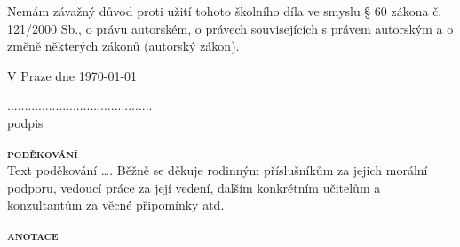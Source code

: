 \documentclass[12pt,a4paper]{article} %
\begin{document}
{Nemám závažný důvod proti užití tohoto školního díla ve smyslu § 60 zákona č. 121/2000 Sb., o právu autorském, o právech souvisejících s právem autorským a o změně některých zákonů (autorský zákon).}\\[0.5cm]

\begin{minipage}{0.49\textwidth}
\begin{flushleft}
{V Praze dne \today}\\%
\bigskip
\bigskip
\end{flushleft}
\end{minipage}
\begin{minipage}{0.49\textwidth}
\begin{flushright}
\centering
{
..........................................\\
podpis
}
\end{flushright}
\end{minipage}

\newpage
\textsc{\textbf{\fontsize{20pt}{0}\selectfont poděkování}}\\

{\color{red} Text poděkování …. Běžně se děkuje rodinným příslušníkům za jejich morální podporu, vedoucí práce za její vedení, dalším konkrétním učitelům a konzultantům za věcné připomínky atd.}

\newpage

\textsc{\textbf{\fontsize{20pt}{0}\selectfont anotace}}\\
\end{document}
